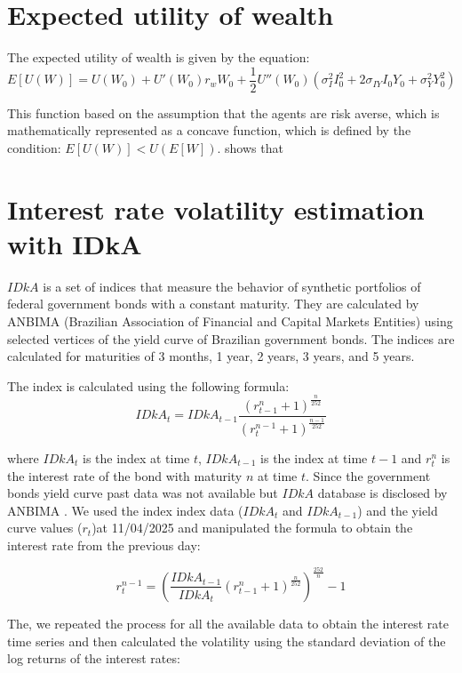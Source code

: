 \documentclass[
	12pt,				%
	twoside,			%
	a4paper,			%
	english,			%
	brazil			%
	]{abntex2}
\begin{document}
\begin{apendicesenv}

\partapendices

\chapter{Expected utility of wealth}

The expected utility of wealth is given by the equation:
\begin{equation}
  E[U(W)] = U(W_0) + U'(W_0)r_w W_0 + \frac{1}{2}U''(W_0)(\sigma_I^2 I_0^2 + 2\sigma_{IY} I_0 Y_0 + \sigma_Y^2 Y_0^2)
\end{equation}

This function based on the assumption that the agents are risk averse, which is mathematically represented as a concave function, which is defined by the condition: $E[U(W)] < U(E[W])$.  shows that 


\chapter{Interest rate volatility estimation with IDkA}

$IDkA$ \cite{anbimaIDkAANBIMA} is a set of indices that measure the behavior of synthetic portfolios of federal government bonds with a constant maturity. They are calculated by ANBIMA (Brazilian Association of Financial and Capital Markets Entities) using selected vertices of the yield curve of Brazilian government bonds. The indices are calculated for maturities of 3 months, 1 year, 2 years, 3 years, and 5 years.

The index is calculated using the following formula:
\begin{equation}
  IDkA_t = IDkA_{t-1} \frac{(r_{t-1}^n + 1)^{\frac{n}{252}}}{(r_{t}^{n-1} + 1)^{\frac{n-1}{252}}}
\end{equation}

where $IDkA_t$ is the index at time $t$, $IDkA_{t-1}$ is the index at time $t-1$ and $r_t^n$ is the interest rate of the bond with maturity $n$ at time $t$. Since the government bonds yield curve past data was not available but $IDkA$ database is disclosed by ANBIMA \cite{IndicesANBIMAData}. We used the index index data ($IDkA_t$ and $IDkA_{t-1}$) and the yield curve values ($r_t$)at 11/04/2025 and manipulated the formula to obtain the interest rate from the previous day:

\begin{equation}
  r_{t}^{n-1} = \left( \frac{IDkA_{t-1}}{IDkA_t} (r_{t-1}^n + 1)^{\frac{n}{252}} \right)^{\frac{252}{n}} - 1
\end{equation}

The, we repeated the process for all the available data to obtain the interest rate time series and then calculated the volatility using the standard deviation of the log returns of the interest rates:

\end{apendicesenv}
\end{document}
